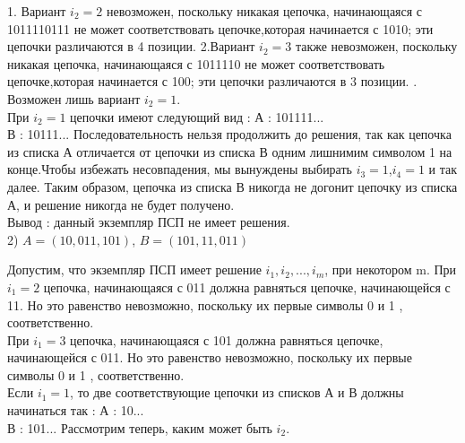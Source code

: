 \documentclass[12pt,a4paper]{article}
\begin{document}
\begin{enumerate}
	1. Вариант $i_2 = 2$ невозможен, поскольку никакая цепочка, начинающаяся с 1011110111 не может соответствовать цепочке,которая начинается с 1010; эти цепочки различаются в 4 позиции.
	\newline
	2.Вариант $i_2 = 3$ также невозможен, поскольку никакая цепочка, начинающаяся с 1011110 не может соответствовать цепочке,которая начинается с 100; эти цепочки различаются в 3 позиции.
	. Возможен лишь вариант $i_2 = 1$.\\
	При $i_2 = 1$ цепочки имеют следующий вид :
	\newline
	А : 101111...\\
	В : 10111...
	\newline
	Последовательность нельзя продолжить до решения, так как цепочка из списка А отличается от цепочки из списка В одним лишнимим символом 1 на конце.Чтобы избежать несовпадения, мы вынуждены выбирать $i_3 = 1$,$i_4 = 1$ и так далее. Таким образом, цепочка из списка В никогда не догонит цепочку из списка А, и решение никогда не будет получено.\\
	\newline
	Вывод : данный экземпляр ПСП не имеет решения.\\
	
	2)  $A=(10,011,101)$, $B=(101,11,011)$
	
	Допустим, что экземпляр ПСП имеет решение $i_{1},i_{2},...,i_{m}$, при некотором m.
	При $i_{1} = 2$ цепочка, начинающаяся с 011 должна равняться цепочке, начинающейся с 11. Но это равенство невозможно, поскольку их первые символы 0 и 1 , соответственно.\\
	При $i_{1} = 3$ цепочка, начинающаяся с 101 должна равняться цепочке, начинающейся с 011. Но это равенство невозможно, поскольку их первые символы 0 и 1 , соответственно.\\
	Если $i_{1} = 1$, то две соответствующие цепочки из списков А и В должны начинаться так :
	\newline
	А : 10... \\
	В : 101...
	\newline
	Рассмотрим теперь, каким может быть $i_2$. 
	

\end{enumerate}
\end{document}
